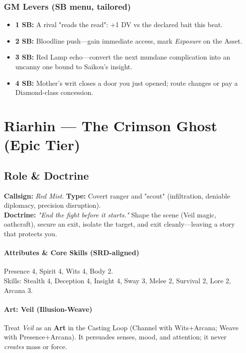 \subsubsection{GM Levers (SB menu, tailored)}
\begin{itemize}
  \item \textbf{1 SB:} A rival "reads the read": +1 DV vs the declared bait this beat.
  \item \textbf{2 SB:} Bloodline push—gain immediate access, mark \emph{Exposure} on the Asset.
  \item \textbf{3 SB:} Red Lamp echo—convert the next mundane complication into an uncanny one bound to Saikou's insight.
  \item \textbf{4 SB:} Mother's writ closes a door you just opened; route changes or pay a Diamond-class concession.
\end{itemize}

\section{Riarhin — The Crimson Ghost (Epic Tier)}

\subsection{Role \& Doctrine}
\textbf{Callsign:} \emph{Red Mist}. \quad
\textbf{Type:} Covert ranger and "scout" (infiltration, deniable diplomacy, precision disruption). \\
\textbf{Doctrine:} \emph{"End the fight before it starts."} Shape the scene (Veil magic, oathcraft), secure  an exit, isolate the target, and exit cleanly—leaving a story that protects you.

\paragraph{Attributes \& Core Skills (SRD-aligned)}
Presence 4, Spirit 4, Wits 4, Body 2. \\
Skills: Stealth 4, Deception 4, Insight 4, Sway 3, Melee 2, Survival 2, Lore 2, Arcana 3.

\paragraph{Art: Veil (Illusion-Weave)}
Treat \emph{Veil} as an \textbf{Art} in the Casting Loop (Channel with Wits+Arcana; Weave with Presence+Arcana). It persuades senses, mood, and attention; it never \emph{creates} mass or force.

